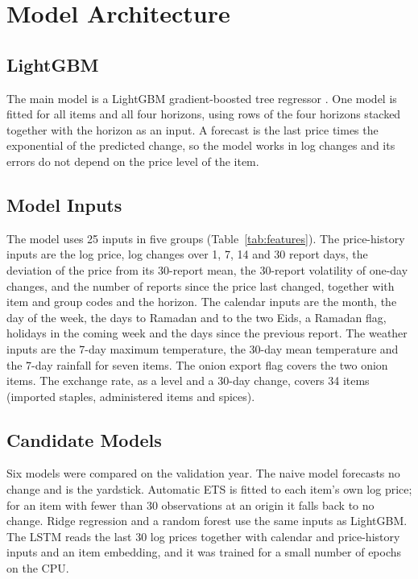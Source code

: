\section{Model Architecture}

\subsection{LightGBM}
The main model is a LightGBM gradient-boosted tree regressor \cite{lightgbm}. One model is fitted for all items and all four horizons, using rows of the four horizons stacked together with the horizon as an input. A forecast is the last price times the exponential of the predicted change, so the model works in log changes and its errors do not depend on the price level of the item.

\subsection{Model Inputs}
The model uses 25 inputs in five groups (Table~\ref{tab:features}). The price-history inputs are the log price, log changes over 1, 7, 14 and 30 report days, the deviation of the price from its 30-report mean, the 30-report volatility of one-day changes, and the number of reports since the price last changed, together with item and group codes and the horizon. The calendar inputs are the month, the day of the week, the days to Ramadan and to the two Eids, a Ramadan flag, holidays in the coming week and the days since the previous report. The weather inputs are the 7-day maximum temperature, the 30-day mean temperature and the 7-day rainfall for seven items. The onion export flag covers the two onion items. The exchange rate, as a level and a 30-day change, covers 34 items (imported staples, administered items and spices).

\begin{table}[H]\centering\small
\caption[Model inputs by driver group]{Model inputs by driver group.}\label{tab:features}

\par{}
\end{table}

\subsection{Candidate Models}
Six models were compared on the validation year. The naive model forecasts no change and is the yardstick. Automatic ETS is fitted to each item's own log price; for an item with fewer than 30 observations at an origin it falls back to no change. Ridge regression and a random forest use the same inputs as LightGBM. The LSTM reads the last 30 log prices together with calendar and price-history inputs and an item embedding, and it was trained for a small number of epochs on the CPU.

